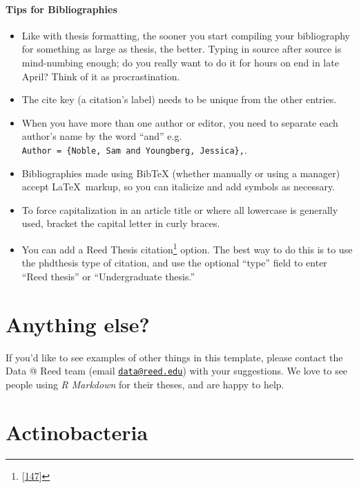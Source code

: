 \documentclass[12pt,twoside]{reedthesis}
\providecommand{\tightlist}{%
  \setlength{\itemsep}{0pt}\setlength{\parskip}{0pt}}
\begin{document}
  \paragraph{Tips for Bibliographies}\label{tips-for-bibliographies}
  
  \begin{itemize}
  \tightlist
  \item
    Like with thesis formatting, the sooner you start compiling your
    bibliography for something as large as thesis, the better. Typing in
    source after source is mind-numbing enough; do you really want to do
    it for hours on end in late April? Think of it as procrastination.
  \item
    The cite key (a citation's label) needs to be unique from the other
    entries.
  \item
    When you have more than one author or editor, you need to separate
    each author's name by the word ``and'' e.g.
    \texttt{Author\ =\ \{Noble,\ Sam\ and\ Youngberg,\ Jessica\},}.
  \item
    Bibliographies made using BibTeX (whether manually or using a manager)
    accept \LaTeX~markup, so you can italicize and add symbols as
    necessary.
  \item
    To force capitalization in an article title or where all lowercase is
    generally used, bracket the capital letter in curly braces.
  \item
    You can add a Reed Thesis citation\footnote{{[}\protect\hyperlink{ref-noble2002}{147}{]}}
    option. The best way to do this is to use the phdthesis type of
    citation, and use the optional ``type'' field to enter ``Reed thesis''
    or ``Undergraduate thesis.''
  \end{itemize}
  
  \section{Anything else?}\label{anything-else}
  
  If you'd like to see examples of other things in this template, please
  contact the Data @ Reed team (email
  \href{mailto:data@reed.edu}{\nolinkurl{data@reed.edu}}) with your
  suggestions. We love to see people using \emph{R Markdown} for their
  theses, and are happy to help.
  
  \section{Actinobacteria}\label{actinobacteria}
  
\end{document}
